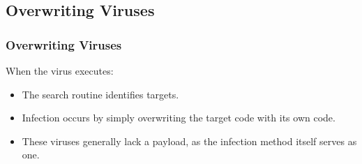 \documentclass{beamer}
\begin{document}
\subsection{Overwriting Viruses}


\begin{frame}
\frametitle{Overwriting Viruses}
When the virus executes:
\begin{itemize}
\item The search routine identifies targets.
\item Infection occurs by simply overwriting the target code with its own code.
\item These viruses generally lack a payload, as the infection method itself serves as one.
\end{itemize}
\end{frame}
\end{document}
